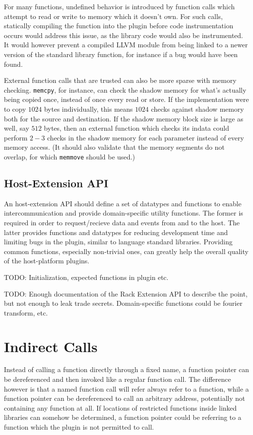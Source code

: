 For many functions, undefined behavior is introduced by function calls which
attempt to read or write to memory which it doesn't own.
For such calls,  statically compiling the function into the plugin before code
instrumentation occurs would address this issue, as the library code would also
be instrumented.
It would however prevent a compiled LLVM module from being linked to a newer
version of the standard library function, for instance if a bug would have been
found.

External function calls that are trusted can also be more sparse with memory
checking.
\texttt{memcpy}, for instance, can check the shadow memory for what's actually
being copied once, instead of once every read or store.
If the implementation were to copy $1024$ bytes individually, this means $1024$
checks against shadow memory both for the source and destination. If the shadow
memory block size is large as well, say $512$ bytes, then an external function
which checks its indata could perform $2-3$ checks in the shadow memory for each
parameter instead of every memory access.
(It should also validate that the memory segments do not overlap, for which
\texttt{memmove} should be used.)

\subsection {Host-Extension API}

An host-extension API should define a set of datatypes and functions to enable
intercommunication and provide domain-specific utility functions.
The former is required in order to request/recieve data and events from and to
the host.
The latter provides functions and datatypes for reducing development time and
limiting bugs in the plugin, similar to language standard libraries.
Providing common functions, especially non-trivial ones, can greatly help the
overall quality of the host-platform plugins.

TODO: Initialization, expected functions in plugin etc.

TODO: Enough documentation of the Rack Extension API to describe the point, but
not enough to leak trade secrets. Domain-specific functions could be fourier
transform, etc.


\section {Indirect Calls}

Instead of calling a function directly through a fixed name, a function pointer
can be dereferenced and then invoked like a regular function call.
The difference however is that a named function call will refer always refer to
a function, while a function pointer can be dereferenced to call an arbitrary
address, potentially not containing any function at all.
If locations of restricted functions inside linked libraries can somehow be
determined, a function pointer could be referring to a function which the plugin
is not permitted to call.

